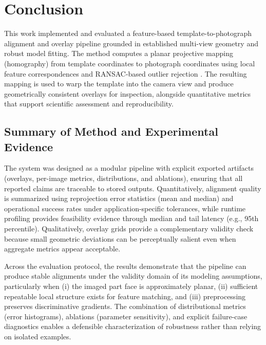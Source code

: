 
\section{Conclusion}
\label{sec:conclusion}

This work implemented and evaluated a feature-based template-to-photograph alignment and overlay pipeline grounded in established multi-view geometry and robust model fitting. The method computes a planar projective mapping (homography) from template coordinates to photograph coordinates using local feature correspondences and RANSAC-based outlier rejection \cite{HartleyZisserman2004,FischlerBolles1981}. The resulting mapping is used to warp the template into the camera view and produce geometrically consistent overlays for inspection, alongside quantitative metrics that support scientific assessment and reproducibility.

\subsection{Summary of Method and Experimental Evidence}
The system was designed as a modular pipeline with explicit exported artifacts (overlays, per-image metrics, distributions, and ablations), ensuring that all reported claims are traceable to stored outputs. Quantitatively, alignment quality is summarized using reprojection error statistics (mean and median) and operational success rates under application-specific tolerances, while runtime profiling provides feasibility evidence through median and tail latency (e.g., 95th percentile). Qualitatively, overlay grids provide a complementary validity check because small geometric deviations can be perceptually salient even when aggregate metrics appear acceptable.

Across the evaluation protocol, the results demonstrate that the pipeline can produce stable alignments under the validity domain of its modeling assumptions, particularly when (i) the imaged part face is approximately planar, (ii) sufficient repeatable local structure exists for feature matching, and (iii) preprocessing preserves discriminative gradients. The combination of distributional metrics (error histograms), ablations (parameter sensitivity), and explicit failure-case diagnostics enables a defensible characterization of robustness rather than relying on isolated examples.

